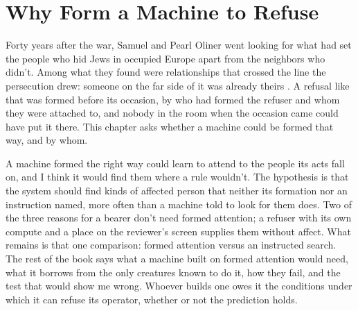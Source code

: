 \chapter{Why Form a Machine to Refuse}
\label{sec:20}
Forty years after the war, Samuel and Pearl Oliner went looking for what had set the people who hid Jews in occupied Europe apart from the neighbors who didn't. Among what they found were relationships that crossed the line the persecution drew: someone on the far side of it was already theirs \autocite{oliner1988altruistic}. A refusal like that was formed before its occasion, by who had formed the refuser and whom they were attached to, and nobody in the room when the occasion came could have put it there. This chapter asks whether a machine could be formed that way, and by whom.

A machine formed the right way could learn to attend to the people its acts fall on, and I think it would find them where a rule wouldn't. The hypothesis is that the system should find kinds of affected person that neither its formation nor an instruction named, more often than a machine told to look for them does. Two of the three reasons for a bearer don't need formed attention; a refuser with its own compute and a place on the reviewer's screen supplies them without affect. What remains is that one comparison: formed attention versus an instructed search. The rest of the book says what a machine built on formed attention would need, what it borrows from the only creatures known to do it, how they fail, and the test that would show me wrong. Whoever builds one owes it the conditions under which it can refuse its operator, whether or not the prediction holds.

